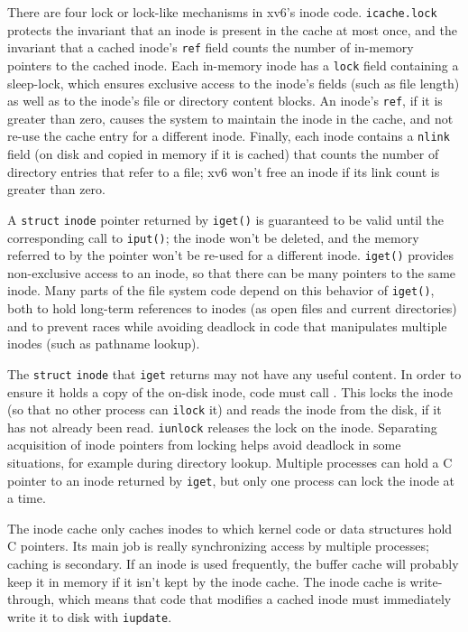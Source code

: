 There are four lock or lock-like mechanisms in xv6's
inode code.
\lstinline{icache.lock}
protects the invariant that an inode is present in the cache
at most once, and the invariant that a cached inode's
\lstinline{ref}
field counts the number of in-memory pointers to the cached inode.
Each in-memory inode has a
\lstinline{lock}
field containing a
sleep-lock, which ensures exclusive access to the
inode's fields (such as file length) as well as to the
inode's file or directory content blocks.
An inode's
\lstinline{ref},
if it is greater than zero, causes the system to maintain
the inode in the cache, and not re-use the cache entry for
a different inode.
Finally, each inode contains a
\lstinline{nlink}
field (on disk and copied in memory if it is cached) that
counts the number of directory entries that refer to a file;
xv6 won't free an inode if its link count is greater than zero.

A
\lstinline{struct}
\lstinline{inode}
pointer returned by
\lstinline{iget()}
is guaranteed to be valid until the corresponding call to
\lstinline{iput()};
the inode won't be deleted, and the memory referred to
by the pointer won't be re-used for a different inode.
\lstinline{iget()}
provides non-exclusive access to an inode, so that
there can be many pointers to the same inode.
Many parts of the file system code depend on this behavior of
\lstinline{iget()},
both to hold long-term references to inodes (as open files
and current directories) and to prevent races while avoiding
deadlock in code that manipulates multiple inodes (such as
pathname lookup).

The
\lstinline{struct}
\lstinline{inode}
that 
\lstinline{iget}
returns may not have any useful content.
In order to ensure it holds a copy of the on-disk
inode, code must call
.
This locks the inode (so that no other process can
\lstinline{ilock}
it) and reads the inode from the disk,
if it has not already been read.
\lstinline{iunlock}
releases the lock on the inode.
Separating acquisition of inode pointers from locking
helps avoid deadlock in some situations, for example during
directory lookup.
Multiple processes can hold a C pointer to an inode
returned by 
\lstinline{iget},
but only one process can lock the inode at a time.

The inode cache only caches inodes to which kernel code
or data structures hold C pointers.
Its main job is really synchronizing access by multiple processes;
caching is secondary.
If an inode is used frequently, the buffer cache will probably
keep it in memory if it isn't kept by the inode cache.
The inode cache is write-through, which means that code that
modifies a cached inode must immediately write it to disk with
\lstinline{iupdate}.
